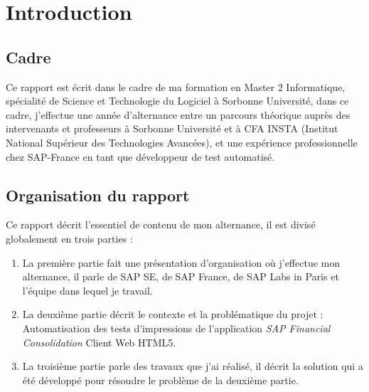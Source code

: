 \section{Introduction}
\subsection{Cadre}
Ce rapport est écrit dans le cadre de ma formation en Master 2 Informatique, spécialité de Science et Technologie du Logiciel à Sorbonne Université, dans ce cadre, j'effectue une année d'alternance entre un parcours théorique auprès des intervenants et professeurs à Sorbonne Université et à CFA INSTA (Institut National Supérieur des Technologies Avancées), et une expérience professionnelle chez SAP-France en tant que développeur de test automatisé.


\subsection{Organisation du rapport}
Ce rapport décrit l'essentiel de contenu de mon alternance, il est divisé globalement en trois parties : 
    \begin{enumerate}
        \item La première partie fait une présentation d'organisation où j'effectue mon alternance, il parle de SAP SE, de SAP France, de SAP Labs in Paris et l'équipe dans lequel je travail.
        \item La deuxième partie décrit le contexte et la problématique du projet : Automatisation des tests d'impressions de l'application \textit{SAP Financial Consolidation} Client Web HTML5. 
        \item La troisième partie parle des travaux que j'ai réalisé, il décrit la solution qui a été développé pour résoudre le problème de la deuxième partie.
    \end{enumerate} 
